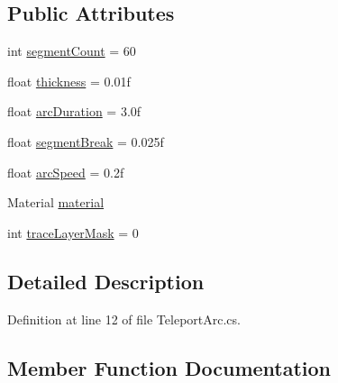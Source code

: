 \subsection*{Public Attributes}
\begin{DoxyCompactItemize}
\item 
int \mbox{\hyperlink{class_valve_1_1_v_r_1_1_interaction_system_1_1_teleport_arc_a335ff5bdb6fcbe66dbc4dd99de791e66}{segment\+Count}} = 60
\item 
float \mbox{\hyperlink{class_valve_1_1_v_r_1_1_interaction_system_1_1_teleport_arc_a36ba65ade47cede067b4687ef9d4b330}{thickness}} = 0.\+01f
\item 
float \mbox{\hyperlink{class_valve_1_1_v_r_1_1_interaction_system_1_1_teleport_arc_a5119dbbe3c29a72b8f1b8846a32c0ae8}{arc\+Duration}} = 3.\+0f
\item 
float \mbox{\hyperlink{class_valve_1_1_v_r_1_1_interaction_system_1_1_teleport_arc_ada4bf2195cc467abeaf4b503324c5f5b}{segment\+Break}} = 0.\+025f
\item 
float \mbox{\hyperlink{class_valve_1_1_v_r_1_1_interaction_system_1_1_teleport_arc_ac3e49c8e27407aa901e3b5096372b306}{arc\+Speed}} = 0.\+2f
\item 
Material \mbox{\hyperlink{class_valve_1_1_v_r_1_1_interaction_system_1_1_teleport_arc_ad535b1a80d5a2a94a2862a60d4bb7c31}{material}}
\item 
int \mbox{\hyperlink{class_valve_1_1_v_r_1_1_interaction_system_1_1_teleport_arc_a655a026794c332f906afdbe6bf50b937}{trace\+Layer\+Mask}} = 0
\end{DoxyCompactItemize}


\subsection{Detailed Description}


Definition at line 12 of file Teleport\+Arc.\+cs.



\subsection{Member Function Documentation}
\mbox{\label{class_valve_1_1_v_r_1_1_interaction_system_1_1_teleport_arc_adaa3a493238168dffd0842e6fc46a0ef}} 
